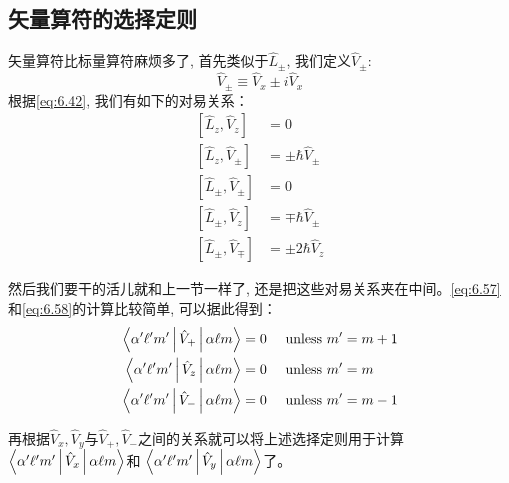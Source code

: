 \subsection{矢量算符的选择定则}
矢量算符比标量算符麻烦多了, 首先类似于$\hat L_\pm$, 我们定义$\hat V_\pm$:
\begin{equation}
    \hat V_\pm\equiv\hat{V}_x\pm i \hat{V}_x
\end{equation}
根据\ref{eq:6.42}, 我们有如下的对易关系：
\begin{align}
    {\left[\hat{L}_{z}, \hat{V}_{z}\right] } &=0 \label{eq:6.57}\\
    {\left[\hat{L}_{z}, \hat{V}_{\pm}\right] } &=\pm \hbar \hat{V}_{\pm} \label{eq:6.58} \\
    {\left[\hat{L}_{\pm}, \hat{V}_{\pm}\right] } &=0 \label{eq:6.59} \\
    {\left[\hat{L}_{\pm}, \hat{V}_{z}\right] } &=\mp \hbar \hat{V}_{\pm} \label{eq:6.60} \\
    {\left[\hat{L}_{\pm}, \hat{V}_{\mp}\right] } &=\pm 2 \hbar \hat{V}_{z} \label{eq:6.61}
\end{align}

然后我们要干的活儿就和上一节一样了, 还是把这些对易关系夹在中间。\ref{eq:6.57}和\ref{eq:6.58}的计算比较简单, 可以据此得到：
\begin{align}
    \Braket{\alpha^{\prime} \ell^{\prime} m^{\prime}|\hat{V}_{+}| \alpha \ell m}  & = 0 \quad \text { unless } m^{\prime}  = m+1\label{eq:6.63}\\
    \Braket{\alpha^{\prime} \ell^{\prime} m^{\prime}|\hat{V}_{z}| \alpha \ell m}  & = 0 \quad \text { unless } m^{\prime}  = m\label{eq:6.64}\\
    \Braket{\alpha^{\prime} \ell^{\prime} m^{\prime}|\hat{V}_{-}| \alpha \ell m}  & = 0 \quad \text { unless } m^{\prime}  = m-1 \label{eq:6.65}
\end{align}

再根据$\hat{V}_x,\hat{V}_y$与$\hat{V}_+,\hat{V}_-$之间的关系就可以将上述选择定则用于计算$\Braket{\alpha^{\prime} \ell^{\prime} m^{\prime}|\hat{V}_{x}| \alpha \ell m}$和
$\Braket{\alpha^{\prime} \ell^{\prime} m^{\prime}|\hat{V}_{y}| \alpha \ell m}$了。

